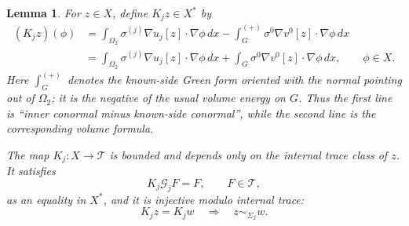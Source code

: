 \documentclass[11pt,oneside]{article}
\newtheorem{lemma}[theorem]{Lemma}
\begin{document}
\begin{lemma}
\label{lem:conormal-difference-functionals}
For \(z\in X\), define \(K_jz\in X^*\) by
\begin{equation}
\begin{split}
  (K_jz)(\phi)
  &=\int_{\Omega_2}\sigma^{(j)}\nabla u_j[z]\cdot\nabla\phi\,dx
    -\int_G^{(+)}\sigma^0\nabla v^0[z]\cdot\nabla\phi\,dx\\
  &=\int_{\Omega_2}\sigma^{(j)}\nabla u_j[z]\cdot\nabla\phi\,dx
    +\int_G\sigma^0\nabla v^0[z]\cdot\nabla\phi\,dx,
  \qquad \phi\in X.
  \label{eq:conormal-difference-functional}
\end{split}
\end{equation}
Here \(\int_G^{(+)}\) denotes the known-side Green form oriented with the
normal pointing out of \(\Omega_2\); it is the negative of the usual volume
energy on \(G\).  Thus the first line is ``inner conormal minus known-side
conormal'', while the second line is the corresponding volume formula.

The map \(K_j:X\to\mathcal T\) is bounded and depends only on the internal
trace class of \(z\).  It satisfies
\begin{equation}
  K_j\mathcal G_jF=F,
  \qquad F\in\mathcal T,
  \label{eq:conormal-left-inverse}
\end{equation}
as an equality in \(X^*\), and it is injective modulo internal trace:
\begin{equation}
  K_jz=K_jw\quad\Longrightarrow\quad z\sim_{\Sigma_2}w.
  \label{eq:conormal-trace-injectivity}
\end{equation}
\end{lemma}
\end{document}
